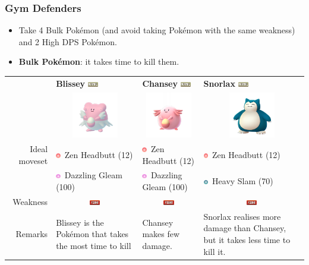 \documentclass[12pt]{beamer}
\newcommand{\fightingfull}{\includegraphics[height=0.2cm]{../../images/type/full/Fighting.png}}
\newcommand{\normalfull}{\includegraphics[height=0.2cm]{../../images/type/full/Normal.png}}
\newcommand{\psysimp}{\includegraphics[height=0.2cm]{../../images/type/simplified/psy.png}}
\newcommand{\steelsimp}{\includegraphics[height=0.2cm]{../../images/type/simplified/steel.png}}
\newcommand{\fairysimp}{\includegraphics[height=0.2cm]{../../images/type/simplified/fairy.png}}
\begin{document}
\begin{frame}
\frametitle{Gym Defenders}

\begin{block}{}
\begin{footnotesize}

\begin{itemize}
  \item Take 4 Bulk Pok\'emon (and avoid taking Pok\'emon with the same weakness) and 2 High DPS Pok\'emon.
  \item \textbf{Bulk Pok\'emon}: it takes time to kill them. 
 \end{itemize}

\begin{center}
\begin{tabular}{rp{3.2cm}p{3.2cm}p{3.2cm}}
&\textbf{Blissey} \hfill \normalfull& \textbf{Chansey} \hfill \normalfull & \textbf{Snorlax} \hfill \normalfull \\
&\multicolumn{1}{c}{\includegraphics[width=2cm]{../../images/pokemon/Blissey}} & 
\multicolumn{1}{c}{\includegraphics[width=2cm]{../../images/pokemon/Chansey}} &
\multicolumn{1}{c}{\includegraphics[width=2cm]{../../images/pokemon/Snorlax}} \\ \hline
Ideal moveset &\psysimp~Zen Headbutt (12) & \psysimp~Zen Headbutt (12) & \psysimp~Zen Headbutt (12)   \\
&\fairysimp~Dazzling Gleam (100) & \fairysimp~Dazzling Gleam (100) & \steelsimp~Heavy Slam (70)  \\ \hline
Weakness & \multicolumn{1}{c}{\fightingfull} & \multicolumn{1}{c}{\fightingfull} & \multicolumn{1}{c}{\fightingfull}  \\ \hline
Remarks & Blissey is the Pok\'emon that takes the most time to kill & Chansey makes few damage. & Snorlax realises more damage than Chansey, but it takes less time to kill it.   \\
\end{tabular}
\end{center}


\end{footnotesize}
\end{block}
\end{frame}
\end{document}
